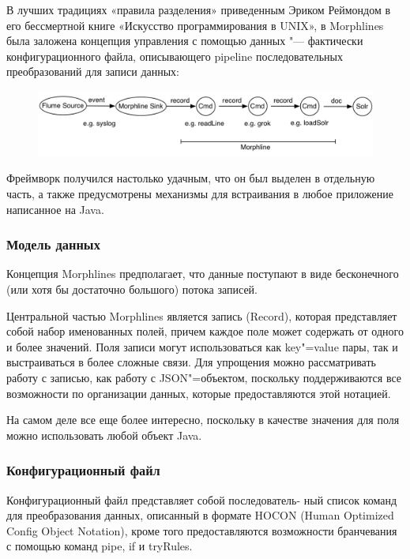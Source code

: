 \documentclass[10pt, a5paper]{article}
\begin{document}
В лучших традициях «правила разделения» приведенным Эриком Реймондом в его бессмертной книге «Искусство программирования в UNIX», в Morphlines была заложена концепция управления с помощью данных "--- фактически конфигурационного файла, описывающего pipeline последовательных преобразований для записи данных:

\begin{figure}[h!]
  \centering
  \includegraphics[scale=0.5]{21_2014_morphlines.jpg}
\end{figure}

Фреймворк получился настолько удачным, что он был выделен в отдельную часть, а также предусмотрены механизмы для встраивания в любое приложение написанное на Java.

\subsubsection*{Модель данных}

Концепция Morphlines предполагает, что данные поступают в виде бесконечного (или хотя бы достаточно большого) потока записей.

Центральной частью Morphlines является запись (Record), которая представляет собой набор именованных полей, причем каждое поле может содержать от одного и более значений. Поля записи могут использоваться как key"=value пары, так и выстраиваться в более сложные связи. Для упрощения можно рассматривать работу с записью, как работу с JSON"=объектом, поскольку поддерживаются все возможности по организации данных, которые предоставляются этой нотацией.

На самом деле все еще более интересно, поскольку в качестве значения для поля можно использовать любой объект Java.

\subsubsection*{Конфигурационный файл}

Конфигурационный файл представляет собой последователь- \linebreak ный список команд для преобразования данных, описанный в формате HOCON (Human Optimized Config Object Notation), кроме того предоставляются возможности бранчевания с помощью команд pipe, if и tryRules.
\end{document}
